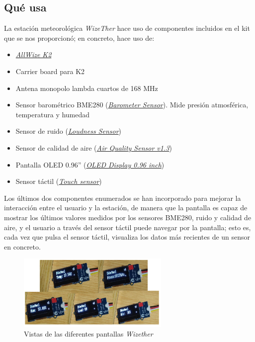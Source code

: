 \documentclass[12pt]{article}
\begin{document}
\subsection{Qué usa}

La estación meteorológica \textit{WizeTher} hace uso de componentes incluidos en el kit que se nos proporcionó; en concreto, hace uso de:

\begin{itemize}
	\item \href{https://www.allwize.io/product-page/the-allwize-k2}{\textit{AllWize K2}}
	\item Carrier board para K2
	\item Antena monopolo lambda cuartos de 168 MHz
	\item Sensor barométrico BME280 (\href{https://wiki.seeedstudio.com/Grove-Barometer_Sensor-BME280/}{\textit{Barometer Sensor}}). Mide presión atmosférica, temperatura y humedad
	\item Sensor de ruido (\href{https://wiki.seeedstudio.com/Grove-Loudness_Sensor/}{\textit{Loudness Sensor}})
	\item Sensor de calidad de aire (\href{https://wiki.seeedstudio.com/Grove-Air_Quality_Sensor_v1.3/}{\textit{Air Quality Sensor v1.3}})
	\item Pantalla OLED 0.96'' (\href{https://wiki.seeedstudio.com/Grove-OLED_Display_0.96inch/}{\textit{OLED Display 0.96 inch}})
	\item Sensor táctil (\href{https://wiki.seeedstudio.com/Grove-Touch_Sensor/}{\textit{Touch sensor}})
\end{itemize}

\noindent Los últimos dos componentes enumerados se han incorporado para mejorar la interacción entre el usuario y la estación, de manera que la pantalla es capaz de mostrar los últimos valores medidos por los sensores BME280, ruido y calidad de aire, y el usuario a través del sensor táctil puede navegar por la pantalla; esto es, cada vez que pulsa el sensor táctil, visualiza los datos más recientes de un sensor en concreto. \\

\begin{figure}[h]
	\begin{center}
		\includegraphics[width=0.65\textwidth]{img/Display_Wizether.png}
		\caption{Vistas de las diferentes pantallas \textit{Wizether}}
	\end{center}
\end{figure}
\end{document}
